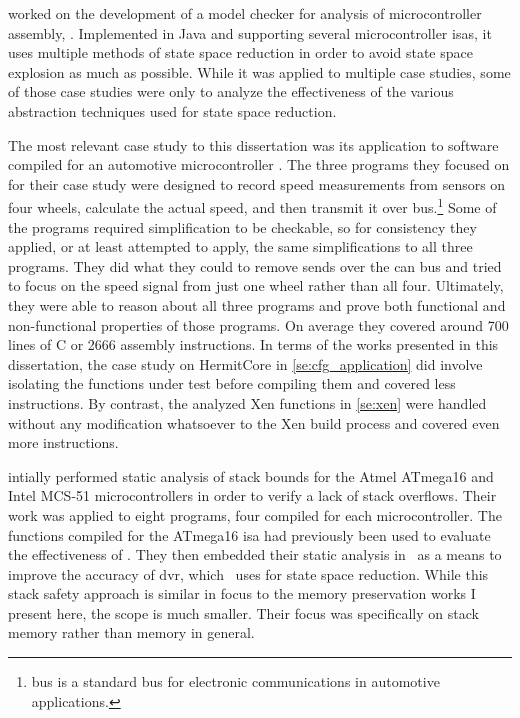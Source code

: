 \Textcite{schlich2008phd} worked on the development of a model checker for analysis
of microcontroller assembly, \mcsquare.
Implemented in Java and supporting several microcontroller \acp{isa},
it uses multiple methods of state space reduction in order to avoid state space explosion
as much as possible. While it was applied to multiple case studies,
some of those case studies were only to analyze the effectiveness
of the various abstraction techniques used for state space reduction.

The most relevant case study to this dissertation was its application
to software compiled for an automotive microcontroller \autocite{schlich2007automotive}.
The three programs they focused on for their case study
were designed to record speed measurements from sensors on four wheels,
calculate the actual speed, and then transmit it over  bus.\footnote{%
   bus is a standard bus for electronic communications
  in automotive applications.%
}
Some of the programs required simplification to be checkable,
so for consistency they applied, or at least attempted to apply,
the same simplifications to all three programs.
They did what they could to remove sends over the \ac{can} bus
and tried to focus on the speed signal from just one wheel rather than all four.
Ultimately, they were able to reason about all three programs
and prove both functional and non-functional properties of those programs.
On average they covered around 700 lines of C or \num{2666} assembly instructions.
In terms of the works presented in this dissertation,
the case study on HermitCore in \cref{se:cfg_application}
did involve isolating the functions under test before compiling them
and covered less instructions.
By contrast, the analyzed Xen functions in \cref{se:xen} were handled
without any modification whatsoever to the Xen build process
and covered even more instructions.

\Textcite{brauer2009sba} intially performed static analysis of stack bounds
for the Atmel ATmega16 and Intel MCS-51 microcontrollers
in order to verify a lack of stack overflows.
Their work was applied to eight programs, four compiled for each microcontroller.
The functions compiled for the ATmega16 \ac{isa}
had previously been used to evaluate the effectiveness of \mcsquare.
They then embedded their static analysis in \mcsquare\ as a means to
improve the accuracy of \ac{dvr}, which \mcsquare\ uses for state space reduction.
While this stack safety approach is similar in focus to the memory preservation works
I present here, the scope is much smaller.
Their focus was specifically on stack memory rather than memory in general.

